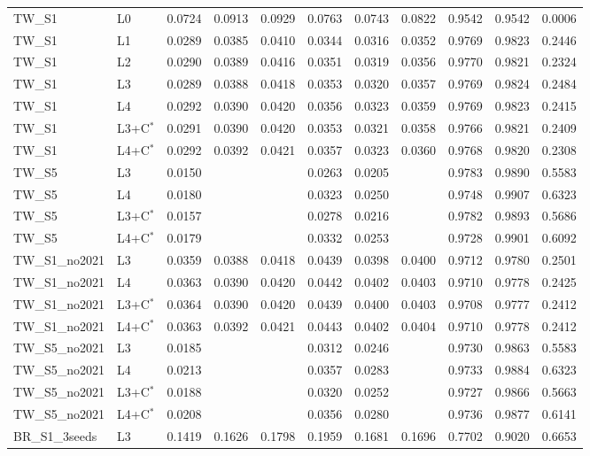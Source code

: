 \begin{tabular}{llrrrrrrrrr}
TW\_S1 & L0 & 0.0724 & 0.0913 & 0.0929 & 0.0763 & 0.0743 & 0.0822 & 0.9542 & 0.9542 & 0.0006 \\
TW\_S1 & L1 & 0.0289 & 0.0385 & 0.0410 & 0.0344 & 0.0316 & 0.0352 & 0.9769 & 0.9823 & 0.2446 \\
TW\_S1 & L2 & 0.0290 & 0.0389 & 0.0416 & 0.0351 & 0.0319 & 0.0356 & 0.9770 & 0.9821 & 0.2324 \\
TW\_S1 & L3 & 0.0289 & 0.0388 & 0.0418 & 0.0353 & 0.0320 & 0.0357 & 0.9769 & 0.9824 & 0.2484 \\
TW\_S1 & L4 & 0.0292 & 0.0390 & 0.0420 & 0.0356 & 0.0323 & 0.0359 & 0.9769 & 0.9823 & 0.2415 \\
TW\_S1 & L3+C$^{*}$ & 0.0291 & 0.0390 & 0.0420 & 0.0353 & 0.0321 & 0.0358 & 0.9766 & 0.9821 & 0.2409 \\
TW\_S1 & L4+C$^{*}$ & 0.0292 & 0.0392 & 0.0421 & 0.0357 & 0.0323 & 0.0360 & 0.9768 & 0.9820 & 0.2308 \\
TW\_S5 & L3 & 0.0150 &  &  & 0.0263 & 0.0205 &  & 0.9783 & 0.9890 & 0.5583 \\
TW\_S5 & L4 & 0.0180 &  &  & 0.0323 & 0.0250 &  & 0.9748 & 0.9907 & 0.6323 \\
TW\_S5 & L3+C$^{*}$ & 0.0157 &  &  & 0.0278 & 0.0216 &  & 0.9782 & 0.9893 & 0.5686 \\
TW\_S5 & L4+C$^{*}$ & 0.0179 &  &  & 0.0332 & 0.0253 &  & 0.9728 & 0.9901 & 0.6092 \\
TW\_S1\_no2021 & L3 & 0.0359 & 0.0388 & 0.0418 & 0.0439 & 0.0398 & 0.0400 & 0.9712 & 0.9780 & 0.2501 \\
TW\_S1\_no2021 & L4 & 0.0363 & 0.0390 & 0.0420 & 0.0442 & 0.0402 & 0.0403 & 0.9710 & 0.9778 & 0.2425 \\
TW\_S1\_no2021 & L3+C$^{*}$ & 0.0364 & 0.0390 & 0.0420 & 0.0439 & 0.0400 & 0.0403 & 0.9708 & 0.9777 & 0.2412 \\
TW\_S1\_no2021 & L4+C$^{*}$ & 0.0363 & 0.0392 & 0.0421 & 0.0443 & 0.0402 & 0.0404 & 0.9710 & 0.9778 & 0.2412 \\
TW\_S5\_no2021 & L3 & 0.0185 &  &  & 0.0312 & 0.0246 &  & 0.9730 & 0.9863 & 0.5583 \\
TW\_S5\_no2021 & L4 & 0.0213 &  &  & 0.0357 & 0.0283 &  & 0.9733 & 0.9884 & 0.6323 \\
TW\_S5\_no2021 & L3+C$^{*}$ & 0.0188 &  &  & 0.0320 & 0.0252 &  & 0.9727 & 0.9866 & 0.5663 \\
TW\_S5\_no2021 & L4+C$^{*}$ & 0.0208 &  &  & 0.0356 & 0.0280 &  & 0.9736 & 0.9877 & 0.6141 \\
BR\_S1\_3seeds & L3 & 0.1419 & 0.1626 & 0.1798 & 0.1959 & 0.1681 & 0.1696 & 0.7702 & 0.9020 & 0.6653 \\

\end{tabular}
